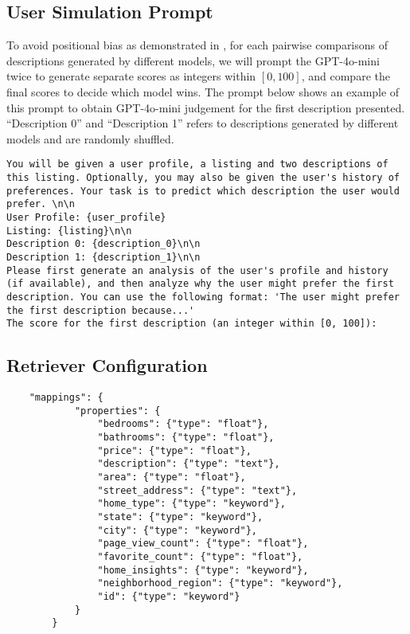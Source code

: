 \subsection{User Simulation Prompt}
\label{app: simulation_prompt}
To avoid positional bias as demonstrated in \citep{zheng2023judging}, for each pairwise comparisons of descriptions generated by different models, we will prompt the GPT-4o-mini twice to generate separate scores as integers within $[0,100]$, and compare the final scores to decide which model wins. The prompt below shows an example of this prompt to obtain GPT-4o-mini judgement for the first description presented. ``Description 0'' and ``Description 1'' refers to descriptions generated by different models and are randomly shuffled. 
\begin{lstlisting}
You will be given a user profile, a listing and two descriptions of this listing. Optionally, you may also be given the user's history of preferences. Your task is to predict which description the user would prefer. \n\n
User Profile: {user_profile}
Listing: {listing}\n\n
Description 0: {description_0}\n\n
Description 1: {description_1}\n\n
Please first generate an analysis of the user's profile and history (if available), and then analyze why the user might prefer the first description. You can use the following format: 'The user might prefer the first description because...'
The score for the first description (an integer within [0, 100]): 
\end{lstlisting}

\subsection{Retriever Configuration}
\label{app: search_engine}

\begin{lstlisting}
    "mappings": {
            "properties": {
                "bedrooms": {"type": "float"},
                "bathrooms": {"type": "float"},
                "price": {"type": "float"},
                "description": {"type": "text"},
                "area": {"type": "float"},
                "street_address": {"type": "text"},
                "home_type": {"type": "keyword"},
                "state": {"type": "keyword"},
                "city": {"type": "keyword"},
                "page_view_count": {"type": "float"},
                "favorite_count": {"type": "float"},
                "home_insights": {"type": "keyword"},
                "neighborhood_region": {"type": "keyword"},
                "id": {"type": "keyword"}
            }
        }
\end{lstlisting}

